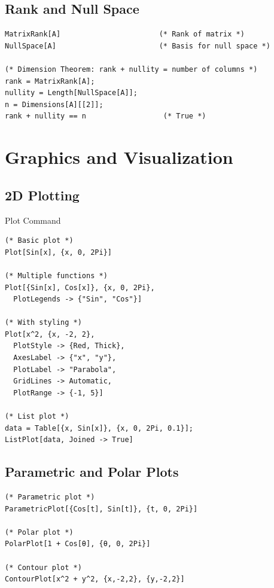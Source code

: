 \documentclass[12pt,a4paper]{article}
\begin{document}
\subsection{Rank and Null Space}

\begin{commandbox}
\begin{lstlisting}
MatrixRank[A]                       (* Rank of matrix *)
NullSpace[A]                        (* Basis for null space *)

(* Dimension Theorem: rank + nullity = number of columns *)
rank = MatrixRank[A];
nullity = Length[NullSpace[A]];
n = Dimensions[A][[2]];
rank + nullity == n                  (* True *)
\end{lstlisting}
\end{commandbox}

\section{Graphics and Visualization}

\subsection{2D Plotting}

\begin{mainbox}{Plot Command}
\begin{lstlisting}
(* Basic plot *)
Plot[Sin[x], {x, 0, 2Pi}]

(* Multiple functions *)
Plot[{Sin[x], Cos[x]}, {x, 0, 2Pi},
  PlotLegends -> {"Sin", "Cos"}]

(* With styling *)
Plot[x^2, {x, -2, 2},
  PlotStyle -> {Red, Thick},
  AxesLabel -> {"x", "y"},
  PlotLabel -> "Parabola",
  GridLines -> Automatic,
  PlotRange -> {-1, 5}]

(* List plot *)
data = Table[{x, Sin[x]}, {x, 0, 2Pi, 0.1}];
ListPlot[data, Joined -> True]
\end{lstlisting}
\end{mainbox}

\subsection{Parametric and Polar Plots}

\begin{commandbox}
\begin{lstlisting}
(* Parametric plot *)
ParametricPlot[{Cos[t], Sin[t]}, {t, 0, 2Pi}]

(* Polar plot *)
PolarPlot[1 + Cos[θ], {θ, 0, 2Pi}]

(* Contour plot *)
ContourPlot[x^2 + y^2, {x,-2,2}, {y,-2,2}]
\end{lstlisting}
\end{commandbox}
\end{document}

